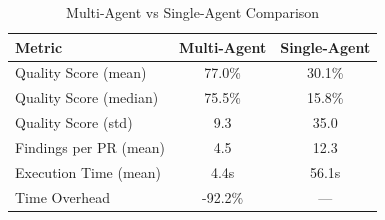 \begin{table}[h]
\centering
\caption{Multi-Agent vs Single-Agent Comparison}
\label{tab:comparison}
\begin{tabular}{lcc}
\toprule
\textbf{Metric} & \textbf{Multi-Agent} & \textbf{Single-Agent} \\
\midrule
Quality Score (mean) & 77.0\% & 30.1\% \\
Quality Score (median) & 75.5\% & 15.8\% \\
Quality Score (std) & 9.3 & 35.0 \\
Findings per PR (mean) & 4.5 & 12.3 \\
Execution Time (mean) & 4.4s & 56.1s \\
Time Overhead & -92.2\% & --- \\
\bottomrule
\end{tabular}
\end{table}
